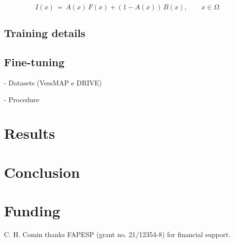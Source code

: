 \documentclass[%
reprint,
nofootinbib,
 amsmath,amssymb,
aps,
superscriptaddress,
showkeys,
longbibliography
]{revtex4-1}
\begin{document}
\begin{equation}
I(x) \,=\, A(x)\,F(x) + (1-A(x))\,B(x), \qquad x \in \Omega.
\label{eq:compose}
\end{equation}

\subsection{Training details}

\subsection{Fine-tuning}

- Datasets (VessMAP e DRIVE)

- Procedure

\section{Results}
\label{s:results}



\section{Conclusion}
\label{s:conclusion}




\section*{Funding}
C. H. Comin thanks FAPESP (grant no. 21/12354-8) for financial support. 



\end{document}
